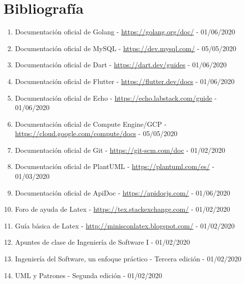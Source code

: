 \chapter{Bibliografía}
\label{ch:capitulo9} 

\begin{enumerate}
	\item Documentación oficial de Golang - \url{https://golang.org/doc/} - 01/06/2020
	\item Documentación oficial de MySQL - \url{https://dev.mysql.com/} - 05/05/2020
	\item Documentación oficial de Dart - \url{https://dart.dev/guides} - 01/06/2020
	\item Documentación oficial de Flutter - \url{https://flutter.dev/docs} - 01/06/2020
	\item Documentación oficial de Echo - \url{https://echo.labstack.com/guide} - 01/06/2020
	\item Documentación oficial de Compute Engine/GCP - \url{https://cloud.google.com/compute/docs} - 05/05/2020
	\item Documentación oficial de Git - \url{https://git-scm.com/doc} - 01/02/2020
	\item Documentación oficial de PlantUML - \url{https://plantuml.com/es/} - 01/03/2020
	\item Documentación oficial de ApiDoc - \url{https://apidocjs.com/} - 01/06/2020
	\item Foro de ayuda de Latex - \url{https://tex.stackexchange.com/} - 01/02/2020
	\item Guía básica de Latex - \url{http://minisconlatex.blogspot.com/} - 01/02/2020
	\item Apuntes de clase de Ingeniería de Software I - 01/02/2020
	\item Ingeniería del Software, un enfoque práctico - Tercera edición - 01/02/2020
	\item UML y Patrones - Segunda edición - 01/02/2020
\end{enumerate}